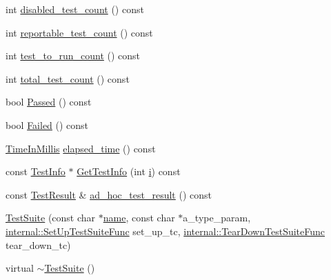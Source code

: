 \begin{DoxyCompactItemize}
\item 
int \mbox{\hyperlink{classtesting_1_1_test_suite_adba738351633471e3256dcf7d3c2e61e}{disabled\+\_\+test\+\_\+count}} () const
\item 
int \mbox{\hyperlink{classtesting_1_1_test_suite_a24f62e17cfd37b90263f1194fb7d4d74}{reportable\+\_\+test\+\_\+count}} () const
\item 
int \mbox{\hyperlink{classtesting_1_1_test_suite_a1ccf2681712a3a27659789009815db8f}{test\+\_\+to\+\_\+run\+\_\+count}} () const
\item 
int \mbox{\hyperlink{classtesting_1_1_test_suite_a38a5e95341cfee5a88d8910f69da4960}{total\+\_\+test\+\_\+count}} () const
\item 
bool \mbox{\hyperlink{classtesting_1_1_test_suite_add51ece89b069b29e07f0476e0e6aae9}{Passed}} () const
\item 
bool \mbox{\hyperlink{classtesting_1_1_test_suite_adec55446c23dc2d0bfea91c6125a1047}{Failed}} () const
\item 
\mbox{\hyperlink{namespacetesting_a992de1d091ce660f451d1e8b3ce30fd6}{Time\+In\+Millis}} \mbox{\hyperlink{classtesting_1_1_test_suite_a2ede69fa37985ab8b21128955c56d6d7}{elapsed\+\_\+time}} () const
\item 
const \mbox{\hyperlink{classtesting_1_1_test_info}{Test\+Info}} $\ast$ \mbox{\hyperlink{classtesting_1_1_test_suite_a604220b75b3c6252287ba62d1d1754a9}{Get\+Test\+Info}} (int \mbox{\hyperlink{_obj__test_2lib_2googletest-master_2googlemock_2test_2gmock-matchers__test_8cc_acb559820d9ca11295b4500f179ef6392}{i}}) const
\item 
const \mbox{\hyperlink{classtesting_1_1_test_result}{Test\+Result}} \& \mbox{\hyperlink{classtesting_1_1_test_suite_a3391a0ec111c66e1ac16a800f5068af7}{ad\+\_\+hoc\+\_\+test\+\_\+result}} () const
\item 
\mbox{\hyperlink{classtesting_1_1_test_suite_a2d6469bcb83701e1bbfe47c465e9731f}{Test\+Suite}} (const char $\ast$\mbox{\hyperlink{classtesting_1_1_test_suite_ab3369db678ca3d9648d6fd63ad038986}{name}}, const char $\ast$a\+\_\+type\+\_\+param, \mbox{\hyperlink{namespacetesting_1_1internal_a028e9455ad22171feabf84fe46329c92}{internal\+::\+Set\+Up\+Test\+Suite\+Func}} set\+\_\+up\+\_\+tc, \mbox{\hyperlink{namespacetesting_1_1internal_ab58aba5acd47d329b72a1d10c7b61648}{internal\+::\+Tear\+Down\+Test\+Suite\+Func}} tear\+\_\+down\+\_\+tc)
\item 
virtual \mbox{\hyperlink{classtesting_1_1_test_suite_a78af2d96b44c8b8f2002b4e74df31c38}{$\sim$\+Test\+Suite}} ()
\item 

\end{DoxyCompactItemize}
